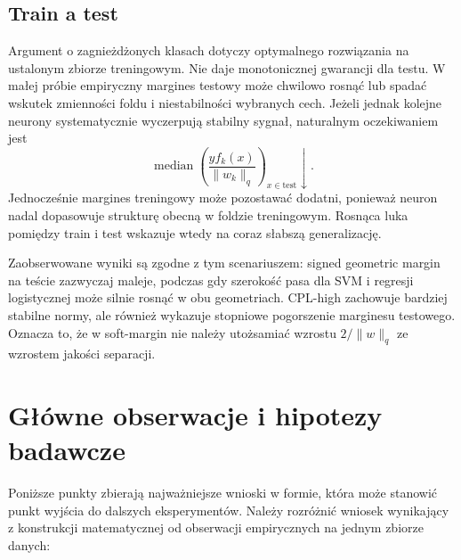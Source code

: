 \documentclass[11pt,a4paper]{article}
\begin{document}
\subsection*{Train a test}

Argument o zagnieżdżonych klasach dotyczy optymalnego rozwiązania na ustalonym zbiorze treningowym. Nie daje
monotonicznej gwarancji dla testu. W małej próbie empiryczny margines testowy może chwilowo rosnąć lub spadać
wskutek zmienności foldu i niestabilności wybranych cech. Jeżeli jednak kolejne neurony systematycznie
wyczerpują stabilny sygnał, naturalnym oczekiwaniem jest
\[
\operatorname{median}\!\left(
\frac{y f_k(x)}{\lVert w_k\rVert_q}
\right)_{x\in\mathrm{test}}
\downarrow.
\]
Jednocześnie margines treningowy może pozostawać dodatni, ponieważ neuron nadal dopasowuje strukturę obecną
w foldzie treningowym. Rosnąca luka pomiędzy train i test wskazuje wtedy na coraz słabszą generalizację.

Zaobserwowane wyniki są zgodne z tym scenariuszem: signed geometric margin na teście zazwyczaj maleje, podczas
gdy szerokość pasa dla SVM i regresji logistycznej może silnie rosnąć w obu geometriach. CPL-high zachowuje
bardziej stabilne normy, ale również wykazuje stopniowe pogorszenie marginesu testowego. Oznacza to, że w
soft-margin nie należy utożsamiać wzrostu $2/\lVert w\rVert_q$ ze wzrostem jakości separacji.

\section{Główne obserwacje i hipotezy badawcze}

Poniższe punkty zbierają najważniejsze wnioski w formie, która może stanowić punkt wyjścia do dalszych
eksperymentów. Należy rozróżnić wniosek wynikający z konstrukcji matematycznej od obserwacji empirycznych na
jednym zbiorze danych:
\end{document}
